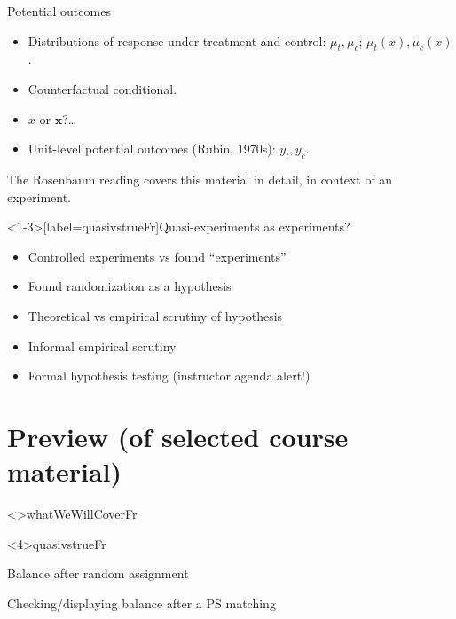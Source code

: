 \begin{frame}{Potential outcomes}
  
  \begin{itemize}[<+->]
  \item Distributions of response under treatment and control: $\mu_{t},
    \mu_{c}$; $\mu_{t}(x), \mu_{c}(x)$.
  \item Counterfactual conditional.
  \item $x$ or $\mathbf{x}$?\ldots
  \item Unit-level potential outcomes (Rubin, 1970s): $y_{t}, y_{c}$.
  \end{itemize}

The Rosenbaum reading covers this material in detail, in context of an experiment.
\end{frame}

\begin{frame}<1-3>[label=quasivstrueFr]{Quasi-experiments as
    experiments?}
  \begin{itemize}[<+->]
  \item Controlled experiments vs found ``experiments''
  \item Found randomization as a hypothesis
  \item Theoretical vs empirical scrutiny of hypothesis
  \item Informal empirical scrutiny
  \item Formal hypothesis testing (instructor agenda alert!)
  \end{itemize}
\end{frame}

\section{Preview (of selected course material)}
\againframe<\nottheirhandout>{whatWeWillCoverFr}

\againframe<4\mynoteonly>{quasivstrueFr}

\begin{frame}{Balance after random assignment}
  \begin{center}
  \end{center}
\end{frame}

\begin{frame}{Checking/displaying balance after a PS matching}
  \begin{center}
  \end{center}
\end{frame}


